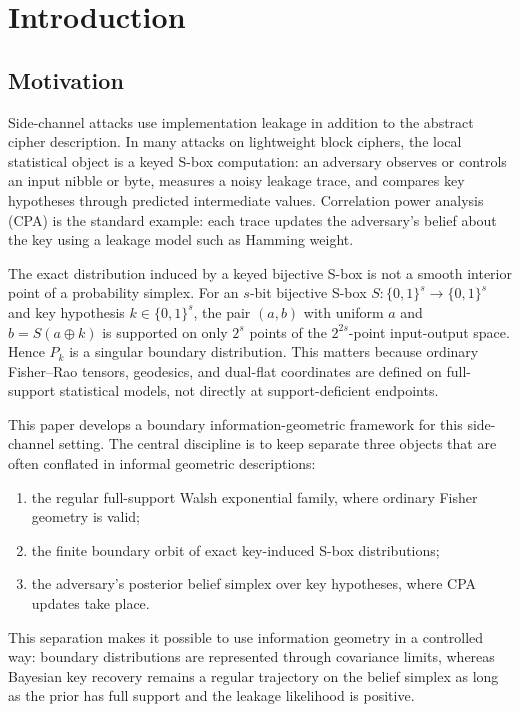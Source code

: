 \section{Introduction}\label{sec:intro}

\subsection{Motivation}

Side-channel attacks use implementation leakage in addition to the abstract
cipher description.  In many attacks on lightweight block ciphers, the
local statistical object is a keyed S-box computation: an adversary observes or
controls an input nibble or byte, measures a noisy leakage trace, and compares
key hypotheses through predicted intermediate values.  Correlation power
analysis (CPA) is the standard example: each trace updates the adversary's
belief about the key using a leakage model such as Hamming weight.

The exact distribution induced by a keyed bijective S-box is not a smooth
interior point of a probability simplex.  For an $s$-bit bijective S-box
$S:\{0,1\}^s\to\{0,1\}^s$ and key hypothesis $k\in\{0,1\}^s$, the pair
$(a,b)$ with uniform $a$ and $b=S(a\oplus k)$ is supported on only $2^s$ points
of the $2^{2s}$-point input-output space.  Hence $P_k$ is a singular boundary
distribution.  This matters because ordinary Fisher--Rao tensors, geodesics,
and dual-flat coordinates are defined on full-support statistical models, not
directly at support-deficient endpoints.

This paper develops a boundary information-geometric framework for this
side-channel setting.  The central discipline is to keep separate three
objects that are often conflated in informal geometric descriptions:
\begin{enumerate}[label=\normalfont(\roman*)]
  \item the regular full-support Walsh exponential family, where ordinary
  Fisher geometry is valid;
  \item the finite boundary orbit of exact key-induced S-box distributions;
  \item the adversary's posterior belief simplex over key hypotheses, where
  CPA updates take place.
\end{enumerate}
This separation makes it possible to use information geometry in a controlled
way: boundary distributions are represented through covariance limits, whereas
Bayesian key recovery remains a regular trajectory on the belief simplex as
long as the prior has full support and the leakage likelihood is positive.


